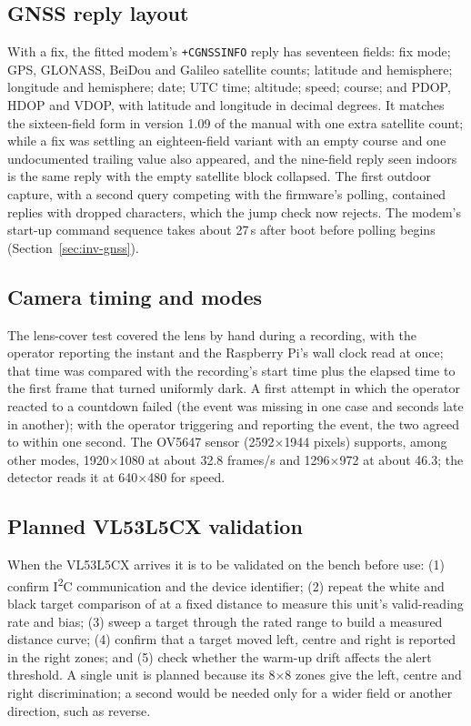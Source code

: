 \subsection*{GNSS reply layout}

With a fix, the fitted modem's \texttt{+CGNSSINFO} reply has seventeen fields: fix mode; GPS, GLONASS, BeiDou and Galileo satellite counts; latitude and hemisphere; longitude and hemisphere; date; UTC time; altitude; speed; course; and PDOP, HDOP and VDOP, with latitude and longitude in decimal degrees. It matches the sixteen-field form in version 1.09 of the manual \cite{simcoma76xx} with one extra satellite count; while a fix was settling an eighteen-field variant with an empty course and one undocumented trailing value also appeared, and the nine-field reply seen indoors is the same reply with the empty satellite block collapsed. The first outdoor capture, with a second query competing with the firmware's polling, contained replies with dropped characters, which the jump check now rejects. The modem's start-up command sequence takes about 27\,s after boot before polling begins (Section~\ref{sec:inv-gnss}).

\subsection*{Camera timing and modes}

The lens-cover test covered the lens by hand during a recording, with the operator reporting the instant and the Raspberry Pi's wall clock read at once; that time was compared with the recording's start time plus the elapsed time to the first frame that turned uniformly dark. A first attempt in which the operator reacted to a countdown failed (the event was missing in one case and seconds late in another); with the operator triggering and reporting the event, the two agreed to within one second. The OV5647 sensor (2592$\times$1944 pixels) supports, among other modes, 1920$\times$1080 at about 32.8 frames/s and 1296$\times$972 at about 46.3; the detector reads it at 640$\times$480 for speed.

\subsection*{Planned VL53L5CX validation}

When the VL53L5CX arrives it is to be validated on the bench before use: (1) confirm I\textsuperscript{2}C communication and the device identifier; (2) repeat the white and black target comparison of \cite{caroleo2026} at a fixed distance to measure this unit's valid-reading rate and bias; (3) sweep a target through the rated range to build a measured distance curve; (4) confirm that a target moved left, centre and right is reported in the right zones; and (5) check whether the warm-up drift affects the alert threshold. A single unit is planned because its 8$\times$8 zones give the left, centre and right discrimination; a second would be needed only for a wider field or another direction, such as reverse.

